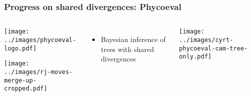 \setcounter{footnote}{0}
\begin{frame}[t]
    \frametitle{Progress on shared divergences: Phycoeval}

    \begin{columns}

        \begin{minipage}[c][\frametextheight][t]{\columnwidth}
            \begin{center}
                \texttt{[image: ../images/phycoeval-logo.pdf]}

                \smallskip
                \texttt{[image: ../images/rj-moves-merge-up-cropped.pdf]}
            \end{center}

            \smallskip
            \begin{itemize}
                \item Bayesian inference of trees with shared divergences
            \end{itemize}
        \end{minipage}


        \begin{minipage}[c][\frametextheight][t]{\columnwidth}
            \begin{center}
                \texttt{[image: ../images/cyrt-phycoeval-cam-tree-only.pdf]}
            \end{center}
        \end{minipage}

    \end{columns}

\end{frame}
\setcounter{footnote}{0}
